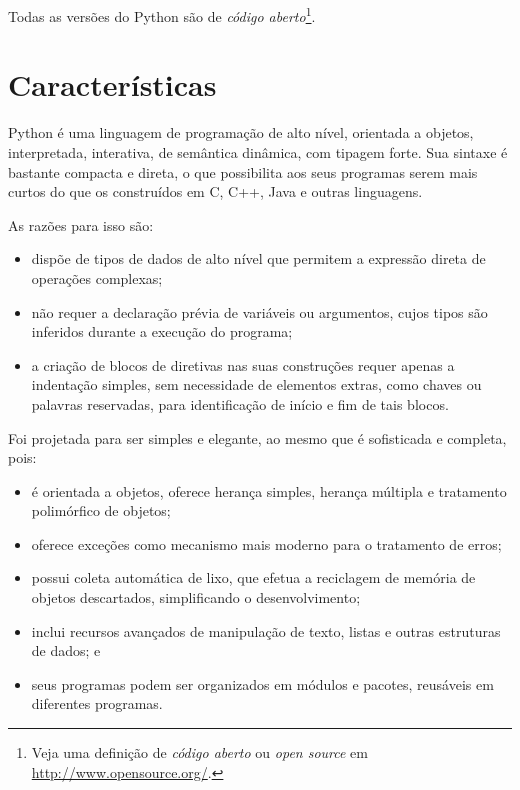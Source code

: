 \documentclass[
]{book}
\providecommand{\tightlist}{%
  \setlength{\itemsep}{0pt}\setlength{\parskip}{0pt}}
\begin{document}
Todas as versões do Python são de \emph{código aberto}\footnote{Veja uma definição de \emph{código aberto} ou \emph{open source} em \url{http://www.opensource.org/}.}.

\hypertarget{introd-carac}{%
\section{Características}\label{introd-carac}}

Python é uma linguagem de programação de alto nível, orientada a objetos, interpretada, interativa, de semântica dinâmica, com tipagem forte. Sua sintaxe é bastante compacta e direta, o que possibilita aos seus programas serem mais curtos do que os construídos em C, C++, Java e outras linguagens.

As razões para isso são:

\begin{itemize}
\tightlist
\item
  dispõe de tipos de dados de alto nível que permitem a expressão direta de operações complexas;
\item
  não requer a declaração prévia de variáveis ou argumentos, cujos tipos são inferidos durante a execução do programa;
\item
  a criação de blocos de diretivas nas suas construções requer apenas a indentação simples, sem necessidade de elementos extras, como chaves ou palavras reservadas, para identificação de início e fim de tais blocos.
\end{itemize}

Foi projetada para ser simples e elegante, ao mesmo que é sofisticada e completa, pois:

\begin{itemize}
\tightlist
\item
  é orientada a objetos, oferece herança simples, herança múltipla e tratamento polimórfico de objetos;
\item
  oferece exceções como mecanismo mais moderno para o tratamento de erros;
\item
  possui coleta automática de lixo, que efetua a reciclagem de memória de objetos descartados, simplificando o desenvolvimento;
\item
  inclui recursos avançados de manipulação de texto, listas e outras estruturas de dados; e
\item
  seus programas podem ser organizados em módulos e pacotes, reusáveis em diferentes programas.
\end{itemize}
\end{document}
